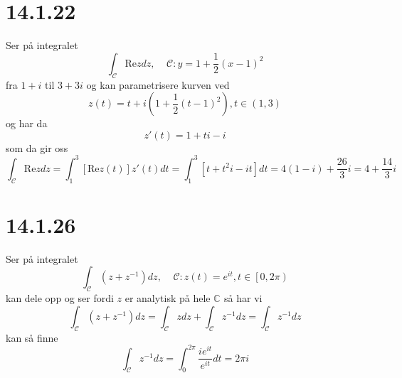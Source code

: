 \documentclass{report}
\newcommand{\M}[2]{\mathbb{#1}^{#2}}
\newcommand{\nbrack}[1]{\left( #1 \right)}
\newcommand{\bbrack}[1]{\left[ #1 \right]}
\newcommand{\re}{\text{Re}}
\begin{document}
\section*{14.1.22}
Ser på integralet
\begin{equation}
  \label{eq:7}
  \int_{\mathcal{C}} \re z dz, \;\;\;\; \mathcal{C} : y = 1 + \frac{1}{2}(x-1)^{2}
\end{equation}
fra $1+i$ til $3+3i$ og kan parametrisere kurven ved
\begin{equation}
  \label{eq:8}
  z(t) = t + i\nbrack{ 1 + \frac{1}{2}(t-1)^{2} }, t \in (1, 3)
\end{equation}
og har da
\begin{equation}
  \label{eq:9}
  z'(t) = 1 + ti - i
\end{equation}
som da gir oss
\begin{equation}
  \label{eq:10}
  \int_{\mathcal{C}} \re z dz = \int_{1}^{3} \bbrack{ \re z(t) } z'(t) dt = \int_{1}^{3} \bbrack{ t + t^{2}i - it } dt = 4(1-i) + \frac{26}{3}i = 4 + \frac{14}{3} i
\end{equation}


\section*{14.1.26}
Ser på integralet
\begin{equation}
  \label{eq:11}
  \int_{\mathcal{C}} (z + z^{-1}) dz, \;\;\;\; \mathcal{C} : z(t) = e^{it}, t\in \left[ 0, 2\pi \right)
\end{equation}
kan dele opp og ser fordi $z$ er analytisk på hele $\M{C}{}$ så har vi
\begin{equation}
  \label{eq:12}
  \int_{\mathcal{C}} (z + z^{-1}) dz = \int_{\mathcal{C}} z dz + \int_{\mathcal{C}} z^{-1}dz = \int_{\mathcal{C}} z^{-1} dz
\end{equation}
kan så finne
\begin{equation}
  \label{eq:13}
  \int_{\mathcal{C}} z^{-1} dz = \int_{0}^{2\pi} \frac{ie^{it}}{e^{it}}dt = 2\pi i
\end{equation}
\end{document}
